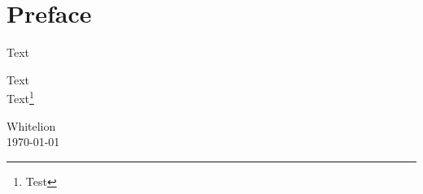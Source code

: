 \chapter{Preface}
\thispagestyle{empty}

Text

\bigskip
Text\\Text\footnote{Test}

\vfill
\begin{flushright}
Whitelion\\
\today
\end{flushright}